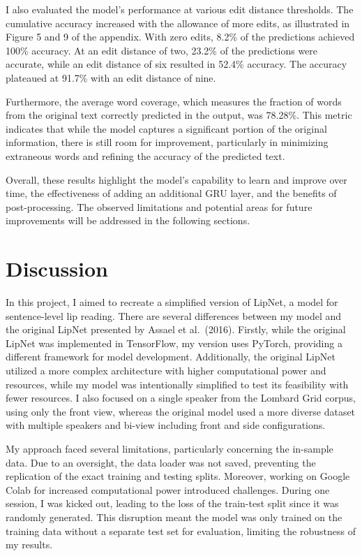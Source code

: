 \documentclass[
]{article}
\begin{document}
I also evaluated the model's performance at various edit distance
thresholds. The cumulative accuracy increased with the allowance of more
edits, as illustrated in Figure 5 and 9 of the appendix. With zero
edits, 8.2\% of the predictions achieved 100\% accuracy. At an edit
distance of two, 23.2\% of the predictions were accurate, while an edit
distance of six resulted in 52.4\% accuracy. The accuracy plateaued at
91.7\% with an edit distance of nine.

Furthermore, the average word coverage, which measures the fraction of
words from the original text correctly predicted in the output, was
78.28\%. This metric indicates that while the model captures a
significant portion of the original information, there is still room for
improvement, particularly in minimizing extraneous words and refining
the accuracy of the predicted text.

Overall, these results highlight the model's capability to learn and
improve over time, the effectiveness of adding an additional GRU layer,
and the benefits of post-processing. The observed limitations and
potential areas for future improvements will be addressed in the
following sections.

\section{Discussion}\label{discussion}

In this project, I aimed to recreate a simplified version of LipNet, a
model for sentence-level lip reading. There are several differences
between my model and the original LipNet presented by Assael et
al.~(2016). Firstly, while the original LipNet was implemented in
TensorFlow, my version uses PyTorch, providing a different framework for
model development. Additionally, the original LipNet utilized a more
complex architecture with higher computational power and resources,
while my model was intentionally simplified to test its feasibility with
fewer resources. I also focused on a single speaker from the Lombard
Grid corpus, using only the front view, whereas the original model used
a more diverse dataset with multiple speakers and bi-view including
front and side configurations.

My approach faced several limitations, particularly concerning the
in-sample data. Due to an oversight, the data loader was not saved,
preventing the replication of the exact training and testing splits.
Moreover, working on Google Colab for increased computational power
introduced challenges. During one session, I was kicked out, leading to
the loss of the train-test split since it was randomly generated. This
disruption meant the model was only trained on the training data without
a separate test set for evaluation, limiting the robustness of my
results.
\end{document}
